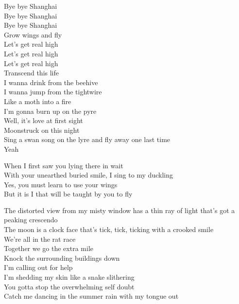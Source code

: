 


Bye bye Shanghai\\
Bye bye Shanghai\\
Bye bye Shanghai\\
Grow wings and fly\\
Let's get real high\\
Let's get real high\\
Let's get real high\\
Transcend this life\\

I wanna drink from the beehive\\
I wanna jump from the tightwire\\
Like a moth into a fire\\
I'm gonna burn up on the pyre\\
Well, it's love at first sight\\
Moonstruck on this night\\
Sing a swan song on the lyre and fly away one last time\\
Yeah\\


When I first saw you lying there in wait\\
With your unearthed buried smile, I sing to my duckling\\
Yes, you must learn to use your wings\\
But it is I that will be taught by you to fly\\


The distorted view from my misty window has a thin ray of light that's got a peaking crescendo\\
The moon is a clock face that's tick, tick, ticking with a crooked smile\\
We're all in the rat race\\
Together we go the extra mile\\

Knock the surrounding buildings down\\
I'm calling out for help\\
I'm shedding my skin like a snake slithering\\
You gotta stop the overwhelming self doubt\\
Catch me dancing in the summer rain with my tongue out\\
